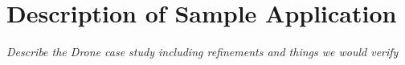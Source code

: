 

\section{Description of Sample Application}

\emph{Describe the Drone case study including refinements and things we would verify}
